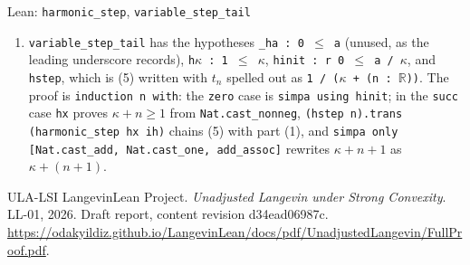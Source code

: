 \documentclass[11pt,a4paper]{article}
\begin{document}
\begin{leanbox}{Lean: \texttt{harmonic\_\allowbreak{}step}, \texttt{variable\_\allowbreak{}step\_\allowbreak{}tail}}
\begin{enumerate}
\item \texttt{variable\_\allowbreak{}step\_\allowbreak{}tail} has the hypotheses \texttt{\_\allowbreak{}ha : 0 \ensuremath{\le} a} (unused, as the leading underscore records), \texttt{h\ensuremath{\kappa} : 1 \ensuremath{\le} \ensuremath{\kappa}}, \texttt{hinit : r 0 \ensuremath{\le} a /\allowbreak{} \ensuremath{\kappa}}, and \texttt{hstep}, which is (5) written with \(t_n\) spelled out as \texttt{1 /\allowbreak{} (\ensuremath{\kappa} + (n : \ensuremath{\mathbb R}))}. The proof is \texttt{induction n with}: the \texttt{zero} case is \texttt{simpa using hinit}; in the \texttt{succ} case \texttt{hx} proves \(\kappa+n\ge1\) from \texttt{Nat.\allowbreak{}cast\_\allowbreak{}nonneg}, \texttt{(hstep n).\allowbreak{}trans (harmonic\_\allowbreak{}step hx ih)} chains (5) with part (1), and \texttt{simpa only [Nat.\allowbreak{}cast\_\allowbreak{}add, Nat.\allowbreak{}cast\_\allowbreak{}one, add\_\allowbreak{}assoc]} rewrites \(\kappa+n+1\) as \(\kappa+(n+1)\).

\end{enumerate}
\end{leanbox}

\begin{thebibliography}{ULA-LSI}
LangevinLean Project. \emph{Unadjusted Langevin under Strong Convexity}. LL-01, 2026. Draft report, content revision d34ead06987c. \url{https://odakyildiz.github.io/LangevinLean/docs/pdf/UnadjustedLangevin/FullProof.pdf}.
\end{thebibliography}
\end{document}

